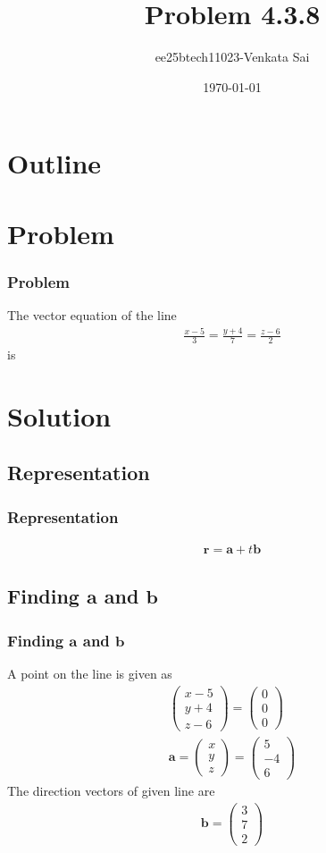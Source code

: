 \documentclass{beamer}
\title{Problem 4.3.8}
\author{ee25btech11023-Venkata Sai}
\date{\today}
\theoremstyle{remark}
\newcommand{\myvec}[1]{\ensuremath{\begin{pmatrix}#1\end{pmatrix}}}
\let\vec\mathbf
\numberwithin{equation}{section}
\begin{document}
\begin{frame}
\titlepage
\end{frame}

\section*{Outline}
\begin{frame}
\tableofcontents
\end{frame}

\section{Problem}

\begin{frame}
\frametitle{Problem}
\setcounter{section}{1}
 The vector equation of the line
\begin{align}
\frac{x-5}{3} = \frac{y+4}{7} = \frac{z-6}{2}
\end{align}
is
\end{frame}
\section{Solution}
 
\subsection{Representation}
\begin{frame}
\frametitle{Representation}
\begin{align}
    \vec{r}=\vec{a}+t\vec{b} 
    \end{align}
\end{frame}
\subsection{Finding $\vec{a}$ and $\vec{b}$}
\begin{frame}
\frametitle{Finding $\vec{a}$ and $\vec{b}$}
A point on the line  is given as
\begin{align}
\myvec{x-5 \\y+4 \\z-6}=\myvec{0\\0\\0}\\
\vec{a}=\myvec{x\\y\\z}=\myvec{5\\-4\\6}
\end{align}
The direction vectors of given line are
\begin{align}
    \vec{b}=\myvec{3\\7\\2}
\end{align}
\end{frame}
\end{document}
